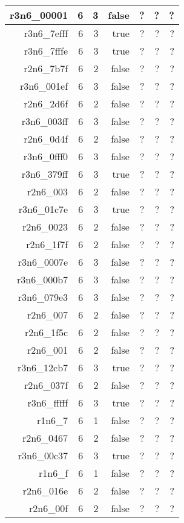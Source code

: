 \begin{center}
\begin{longtable}{rrrrrrr}
  r3n6\_00001 & 6 & 3 & false & ? & ? & ? \\ \hline
  r3n6\_7efff & 6 & 3 & true & ? & ? & ? \\ \hline
  r3n6\_7fffe & 6 & 3 & true & ? & ? & ? \\ \hline
  r2n6\_7b7f & 6 & 2 & false & ? & ? & ? \\ \hline
  r3n6\_001ef & 6 & 3 & false & ? & ? & ? \\ \hline
  r2n6\_2d6f & 6 & 2 & false & ? & ? & ? \\ \hline
  r3n6\_003ff & 6 & 3 & false & ? & ? & ? \\ \hline
  r2n6\_0d4f & 6 & 2 & false & ? & ? & ? \\ \hline
  r3n6\_0fff0 & 6 & 3 & false & ? & ? & ? \\ \hline
  r3n6\_379ff & 6 & 3 & true & ? & ? & ? \\ \hline
  r2n6\_003 & 6 & 2 & false & ? & ? & ? \\ \hline
  r3n6\_01c7e & 6 & 3 & true & ? & ? & ? \\ \hline
  r2n6\_0023 & 6 & 2 & false & ? & ? & ? \\ \hline
  r2n6\_1f7f & 6 & 2 & false & ? & ? & ? \\ \hline
  r3n6\_0007e & 6 & 3 & false & ? & ? & ? \\ \hline
  r3n6\_000b7 & 6 & 3 & false & ? & ? & ? \\ \hline
  r3n6\_079e3 & 6 & 3 & false & ? & ? & ? \\ \hline
  r2n6\_007 & 6 & 2 & false & ? & ? & ? \\ \hline
  r2n6\_1f5c & 6 & 2 & false & ? & ? & ? \\ \hline
  r2n6\_001 & 6 & 2 & false & ? & ? & ? \\ \hline
  r3n6\_12cb7 & 6 & 3 & true & ? & ? & ? \\ \hline
  r2n6\_037f & 6 & 2 & false & ? & ? & ? \\ \hline
  r3n6\_fffff & 6 & 3 & true & ? & ? & ? \\ \hline
  r1n6\_7 & 6 & 1 & false & ? & ? & ? \\ \hline
  r2n6\_0467 & 6 & 2 & false & ? & ? & ? \\ \hline
  r3n6\_00c37 & 6 & 3 & true & ? & ? & ? \\ \hline
  r1n6\_f & 6 & 1 & false & ? & ? & ? \\ \hline
  r2n6\_016e & 6 & 2 & false & ? & ? & ? \\ \hline
  r2n6\_00f & 6 & 2 & false & ? & ? & ? \\ \hline

\end{longtable}
\end{center}
